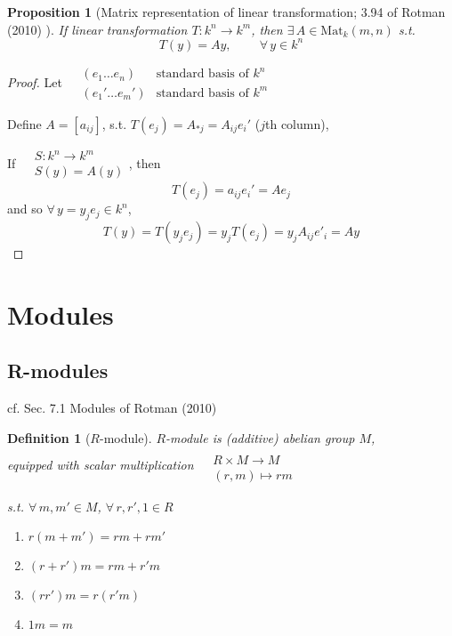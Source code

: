 \documentclass[10pt]{amsart}
\newtheorem{proposition}{Proposition}
\newtheorem{definition}{Definition}
\begin{document}
\begin{multicols*}{2}
\begin{proposition}[Matrix representation of linear transformation; 3.94 of Rotman (2010) \cite{JRotman2010}]\label{Prop:MatRepofLinearTransform}
	If linear transformation $T: k^n \to k^m$, then $\exists \,  A \in \text{Mat}_k(m,n)$ s.t. 
	\[
	T(y) = Ay, \qquad \  \forall \, y \in k^n
	\]
\end{proposition}

\begin{proof}
	Let $\begin{aligned} & (e_1\dots e_n) & \text{standard basis of $k^n$ }   \\
	& (e_1' \dots e_m') & \text{standard basis of $k^m$ }  \end{aligned}$

Define $A=[a_{ij}]$, s.t. $T(e_j) = A_{*j} = A_{ij} e_i'$ ($j$th column), 

If $\begin{aligned} 
& S:k^n \to k^m \\ 
& S(y) = A(y) \end{aligned}$, then 
\[
T(e_j) = a_{ij}e_i' = Ae_j
\]
and so $\forall \, y = y_je_j \in k^n$, 
\[
T(y) = T(y_je_j) = y_j T(e_j) = y_j A_{ij}e'_i = Ay
\]


	\end{proof}

\section{Modules}

\subsection{R-modules}

cf. Sec. 7.1 Modules of Rotman (2010) \cite{JRotman2010}

\begin{definition}[$R$-module]
	$R$-module is (additive) abelian group $M$, \\
	equipped with scalar multiplication $\begin{aligned} & \quad \\
	& R \times M \to M \\
	& (r,m) \mapsto rm \end{aligned}$ 
	
	s.t. $\forall \, m,m' \in M$, $\forall \, r,r',1 \in R$
	\begin{enumerate}
		\item[(i)] $r(m+m')=rm+rm'$
		\item[(ii)] $(r+r')m = rm+r'm$
		\item[(iii)] $(rr')m = r(r'm)$
		\item[(iv)] $1m = m$
	\end{enumerate}
\end{definition}


\end{multicols*}
\end{document}
